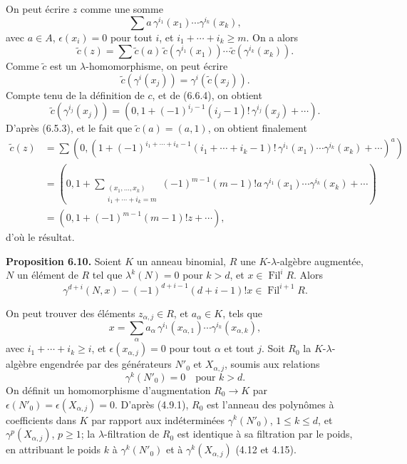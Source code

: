 \documentclass[11pt]{article}
\newcommand{\Fil}{\operatorname{Fil}}
\begin{document}
On peut écrire \(z\) comme une somme
\[
  \sum a\,\gamma^{i_1}(x_1)\cdots\gamma^{i_k}(x_k),
\]
avec \(a\in A\), \(\epsilon(x_i)=0\) pour tout \(i\), et \(i_1+\cdots+i_k\ge m\). On a alors
\[
  \widetilde c(z)=
  \sum \widetilde c(a)\,
        \widetilde c(\gamma^{i_1}(x_1))\cdots
        \widetilde c(\gamma^{i_k}(x_k)).
\]
Comme \(\widetilde c\) est un \(\lambda\)-homomorphisme, on peut écrire
\[
  \widetilde c(\gamma^i(x_j))=\gamma^i(\widetilde c(x_j)).
\]
Compte tenu de la définition de \(c\), et de (6.6.4), on obtient
\[
  \widetilde c(\gamma^{i_j}(x_j))
  =
  \left(0,1+(-1)^{i_j-1}(i_j-1)!\,\gamma^{i_j}(x_j)+\cdots\right).
\]
D'après (6.5.3), et le fait que \(\widetilde c(a)=(a,1)\), on obtient finalement
\[
\begin{aligned}
\widetilde c(z)
&=\sum
\left(0,\left(1+
(-1)^{i_1+\cdots+i_k-1}
(i_1+\cdots+i_k-1)!
\,\gamma^{i_1}(x_1)\cdots\gamma^{i_k}(x_k)
+\cdots\right)^a\right)\\
&=
\left(0,1+
\sum_{\substack{(x_1,\ldots,x_k)\\ i_1+\cdots+i_k=m}}
(-1)^{m-1}(m-1)!a\,\gamma^{i_1}(x_1)\cdots\gamma^{i_k}(x_k)
+\cdots\right)\\
&=
(0,1+(-1)^{m-1}(m-1)!z+\cdots),
\end{aligned}
\]
d'où le résultat.

\textbf{Proposition 6.10.} Soient \(K\) un anneau binomial, \(R\) une \(K\)-\(\lambda\)-algèbre augmentée, \(N\) un élément de \(R\) tel que \(\lambda^k(N)=0\) pour \(k>d\), et \(x\in\Fil^iR\). Alors
\[
  \gamma^{d+i}(N,x)-(-1)^{d+i-1}(d+i-1)!x\in\Fil^{i+1}R.
\]

On peut trouver des éléments \(z_{\alpha,j}\in R\), et \(a_\alpha\in K\), tels que
\[
  x=\sum_\alpha a_\alpha\,
       \gamma^{i_1}(x_{\alpha,1})\cdots
       \gamma^{i_k}(x_{\alpha,k}),
\]
avec \(i_1+\cdots+i_k\ge i\), et \(\epsilon(x_{\alpha,j})=0\) pour tout \(\alpha\) et tout \(j\). Soit \(R_0\) la \(K\)-\(\lambda\)-algèbre engendrée par des générateurs \(N'_0\) et \(X_{\alpha,j}\), soumis aux relations
\[
  \gamma^k(N'_0)=0\quad\text{pour }k>d.
\]
On définit un homomorphisme d'augmentation \(R_0\to K\) par \(\epsilon(N'_0)=\epsilon(X_{\alpha,j})=0\). D'après (4.9.1), \(R_0\) est l'anneau des polynômes à coefficients dans \(K\) par rapport aux indéterminées \(\gamma^k(N'_0)\), \(1\le k\le d\), et \(\gamma^p(X_{\alpha,j})\), \(p\ge1\); la \(\lambda\)-filtration de \(R_0\) est identique à sa filtration par le poids, en attribuant le poids \(k\) à \(\gamma^k(N'_0)\) et à \(\gamma^k(X_{\alpha,j})\) (4.12 et 4.15).
\end{document}
